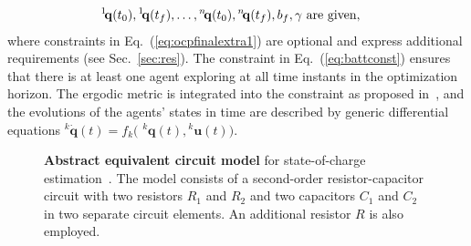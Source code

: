 \documentclass[letterpaper,10pt,conference,twoside]{IEEEtran}
\theoremstyle{definition}
\begin{document}
\begin{subequations}
\begin{align}
  {}^1\hspace*{-.4ex}\mathbf{q}&(t_0),{}^1\hspace*{-.4ex}\mathbf{q}(t_f),\dots,{}^n\hspace*{-.4ex}\mathbf{q}(t_0),{}^n\hspace*{-.4ex}\mathbf{q}(t_f),b_f,\gamma\text{ are given},\label{eq:ocpgivenconst}
\end{align}\end{subequations}
where constraints in Eq.~(\ref{eq:ocpfinalextra1}) are optional and express additional requirements %
(see Sec.~\ref{sec:res}). %
%
The constraint in Eq.~(\ref{eq:battconst}) ensures that there is at least one agent exploring at all time instants in the optimization horizon. 
The ergodic metric is integrated into the constraint as proposed in~\cite{dong2023time}, and 
the evolutions of the agents' states in time are described by generic differential equations ${}^k\dot{\mathbf{q}}(t)=f_k($ ${}^k\mathbf{q}(t),{}^k\mathbf{u}(t))$.%



\begin{figure}[t!]
  \vspace*{-.2cm}
  \begin{minipage}[c]{.43\columnwidth}
    \vspace*{.24cm}
    \caption{\textbf{Abstract equivalent circuit model} for state-of-charge estimation~\cite{seewaldphdthesis}. The model consists of a second-order resistor-capacitor circuit with two resistors $R_1$ and $R_2$ and two capacitors $C_1$ and $C_2$ in two separate circuit elements. An additional resistor $R$ is also employed. %
    } 
    \label{fig:thevenin}
  \end{minipage}
  \begin{minipage}[c]{.57\columnwidth}
    \centering
    \vspace*{-.1cm}
    
  \end{minipage}
  \vspace*{-.4cm}
\end{figure}
\end{document}

